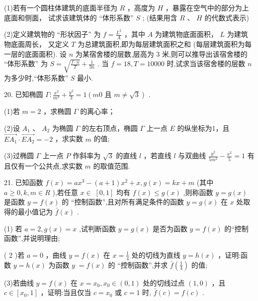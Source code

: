 \documentclass[10pt]{article}
\begin{document}
(1)若有一个圆柱体建筑的底面半径为 \(R\) ，高度为 \(H\) ，暴露在空气中的部分为上底面和侧面， 试求该建筑体的 “体形系数” \(S\) ; (结果用含 \(R\) 、 \(H\) 的代数式表示)

(2)定义建筑物的 “形状因子” 为 \(f = \frac{{L}^{2}}{A}\) ，其中 \(A\) 为建筑物底面面积， \(L\) 为建筑物底面周长， 又定义 \(T\) 为总建筑面积,即为每层建筑面积之和 (每层建筑面积为每一层的底面面积). 设 \(n\) 为某宿舍楼的层数,层高为 3 米,则可以推导出该宿舍楼的 “体形系数” 为 \(S = \sqrt{\frac{f \cdot  n}{T}} + \frac{1}{3n}\) . 当 \(f = {18},T = {10000}\) 时,试求当该宿舍楼的层数 \(n\) 为多少时,“体形系数” \(S\) 最小.

20. 已知椭圆 \(\Gamma  : \frac{{x}^{2}}{{m}^{2}} + \frac{{y}^{2}}{3} = 1\left( {{m0}\text{ 且 }m \neq  \sqrt{3}}\right)\) .

(1)若 \(m = 2\) ，求椭圆 \(\Gamma\) 的离心率；

(2)设 \({A}_{1}\) 、 \({A}_{2}\) 为椭圆 \(\Gamma\) 的左右顶点，椭圆 \(\Gamma\) 上一点 \(E\) 的纵坐标为1，且 \(\overrightarrow{E{A}_{1}} \cdot  \overrightarrow{E{A}_{2}} =  - 2\) ，求实数 \(m\) 的值;

(3)过椭圆 \(\Gamma\) 上一点 \(P\) 作斜率为 \(\sqrt{3}\) 的直线 \(l\) ，若直线 \(l\) 与双曲线 \(\frac{{y}^{2}}{5{m}^{2}} - \frac{{x}^{2}}{5} = 1\) 有且仅有一个公共点,求实数 \(m\) 的取值范围.

21. 已知函数 \(f\left( x\right)  = a{x}^{3} - \left( {a + 1}\right) {x}^{2} + x,g\left( x\right)  = {kx} + m\) (其中 \(a \geq  0,k,m \in  R\) ),若任意 \(x \in \; \left\lbrack  {0,1}\right\rbrack\) 均有 \(f\left( x\right)  \leq  g\left( x\right)\) ,则称函数 \(y = g\left( x\right)\) 是函数 \(y = f\left( x\right)\) 的 “控制函数”,且对所有满足条件的函数 \(y = g\left( x\right)\) 在 \(x\) 处取得的最小值记为 \(\bar{f}\left( x\right)\) .

(1) 若 \(a = 2,g\left( x\right)  = x\) ,试判断函数 \(y = g\left( x\right)\) 是否为函数 \(y = f\left( x\right)\) 的“控制函数”,并说明理由;

( 2 )若 \(a = 0\) ，曲线 \(y = f\left( x\right)\) 在 \(x = \frac{1}{4}\) 处的切线为直线 \(y = h\left( x\right)\) ，证明:函数 \(y = h\left( x\right)\) 为函数 \(y \; = f\left( x\right)\) 的 “控制函数”,并求 \(\bar{f}\left( \frac{1}{4}\right)\) 的值;

(3)若曲线 \(y = f\left( x\right)\) 在 \(x = {x}_{0},{x}_{0} \in  \left( {0,1}\right)\) 处的切线过点 \(\left( {1,0}\right)\) ，且 \(c \in  \left\lbrack  {{x}_{0},1}\right\rbrack\) ，证明:当且仅当 \(c = {x}_{0}\) 或 \(c = 1\) 时, \(\bar{f}\left( c\right)  = f\left( c\right)\) .
\end{document}
